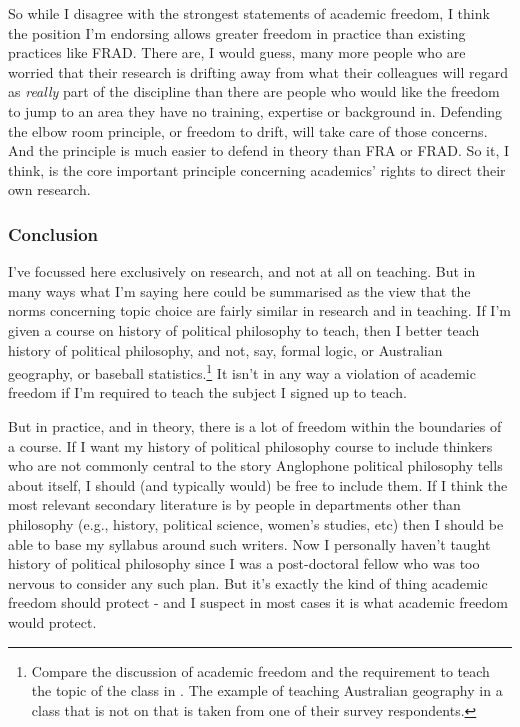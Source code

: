 So while I disagree with the strongest statements of academic freedom, I think the position I'm endorsing allows greater freedom in practice than existing practices like FRAD. There are, I would guess, many more people who are worried that their research is drifting away from what their colleagues will regard as \emph{really} part of the discipline than there are people who would like the freedom to jump to an area they have no training, expertise or background in. Defending the elbow room principle, or freedom to drift, will take care of those concerns. And the principle is much easier to defend in theory than FRA or FRAD. So it, I think, is the core important principle concerning academics' rights to direct their own research.

\subsubsection{Conclusion}
\label{conclusion}

I've focussed here exclusively on research, and not at all on teaching. But in many ways what I'm saying here could be summarised as the view that the norms concerning topic choice are fairly similar in research and in teaching. If I'm given a course on history of political philosophy to teach, then I better teach history of political philosophy, and not, say, formal logic, or Australian geography, or baseball statistics.\footnote{Compare the discussion of academic freedom and the requirement to teach the topic of the class in  \citet{Cole2015}. The example of teaching Australian geography in a class that is not on that is taken from one of their survey respondents.} It isn't in any way a violation of academic freedom if I'm required to teach the subject I signed up to teach.

But in practice, and in theory, there is a lot of freedom within the boundaries of a course. If I want my history of political philosophy course to include thinkers who are not commonly central to the story Anglophone political philosophy tells about itself, I should (and typically would) be free to include them. If I think the most relevant secondary literature is by people in departments other than philosophy (e.g., history, political science, women's studies, etc) then I should be able to base my syllabus around such writers. Now I personally haven't taught history of political philosophy since I was a post-doctoral fellow who was too nervous to consider any such plan. But it's exactly the kind of thing academic freedom should protect - and I suspect in most cases it is what academic freedom would protect.


